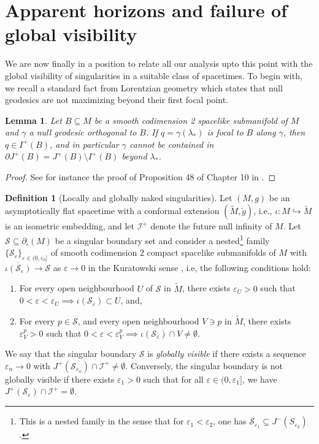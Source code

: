 \documentclass[a4paper, reqno]{amsart}
\numberwithin{equation}{section}
\theoremstyle{plain}
\newtheorem{lemma}[theorem]{Lemma}
\theoremstyle{definition}
\newtheorem{definition}[theorem]{Definition}
\theoremstyle{remark}
\begin{document}
\section{Apparent horizons and failure of global visibility}\label{sec:visibility}
We are now finally in a position to relate all our analysis upto this point with the global visibility of singularities in a suitable class of spacetimes. To begin with, we recall a standard fact from Lorentzian geometry which states that null geodesics are not maximizing beyond their first focal point.
\begin{lemma}\label{standard}
    Let $B\subseteq M$ be a smooth codimension 2 spacelike submanifold of $M$ and $\gamma$ a null geodesic orthogonal to $B$. If $q=\gamma(\lambda_*)$ is focal to $B$ along $\gamma$, then $q\in I^{+}(B)$, and in particular $\gamma$ cannot be contained in $\partial J^+(B)=J^+(B)\setminus I^+(B)$ beyond $\lambda_*$. 
\end{lemma}
\begin{proof}
    See for instance the proof of Proposition 48 of Chapter 10 in \cite{oneill1983semiriemannian}.
    
\end{proof}

\begin{definition}[Locally and globally naked singularities]\label{eq:naked-sing}
    Let $(M,g)$ be an asymptotically flat spacetime with a conformal extension $(\tilde M,\tilde g)$, i.e., $\iota:M\hookrightarrow\tilde M$ is an isometric embedding, and let $\mathscr I^{+}$ denote the future null infinity of $M$. Let $\mathcal S \subseteq \partial_\iota(M)$ be a singular boundary set and consider a nested\footnote{This is a nested family in the sense that for $\varepsilon_1<\varepsilon_2$, one has $\mathcal S_{\varepsilon_1}\subseteq J^-(S_{\varepsilon_2})$.} family $\{\mathcal{S}_{\varepsilon}\}_{\varepsilon\in(0,\varepsilon_0]}$ of smooth codimension $2$ compact spacelike submanifolds of $M$ with $\overline{\iota(\mathcal S_{\varepsilon})}\to \mathcal S$ as $\varepsilon\to 0$ in the Kuratowski sense \cite{Kuratowski1966TopologyVol1}, i.e, the following conditions hold:
\begin{enumerate}
    \item For every open neighbourhood $U$ of $\mathcal{S}$ in $\tilde M$, there exists $\varepsilon_U>0$ such that $0<\varepsilon<\varepsilon_U\implies \iota(\mathcal{S}_{\varepsilon})\subset U$, and,
    \item For every $p\in \mathcal S$, and every open neighbourhood $V\ni p$ in $\tilde M$, there exists $\varepsilon^p_V>0$ such that $0<\varepsilon<\varepsilon^p_V\implies\iota(\mathcal{S}_\varepsilon)\cap V \neq \emptyset$.
\end{enumerate}
We say that the singular boundary $\mathcal{S}$ is \emph{globally visible} if there exists a sequence $\varepsilon_n\to 0$ with $J^+(\mathcal{S}_{\varepsilon_n})\cap \mathscr I^{+}\neq \emptyset$. Conversely, the singular boundary is not globally visible if there exists $\varepsilon_1>0$ such that for all $\varepsilon\in(0,\varepsilon_1]$, we have $J^{+}(\mathcal{S}_{\varepsilon})\cap \mathscr I^{+}=\emptyset$.
\end{definition}
 
\end{document}
